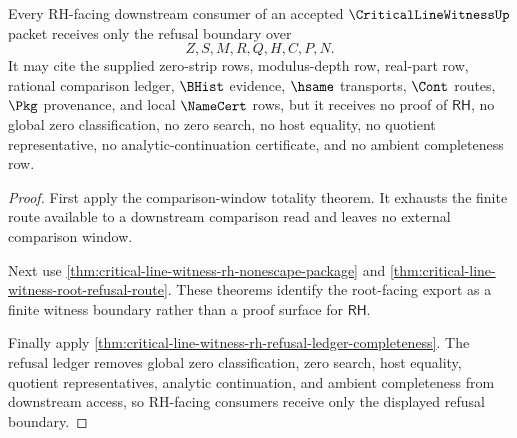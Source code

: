 \begin{theorem}
\label{thm:critical-line-witness-rh-boundary-downstream-lock}
Every RH-facing downstream consumer of an accepted $\CriticalLineWitnessUp$ packet receives only the refusal boundary over
$$
Z,S,M,R,Q,H,C,P,N.
$$
It may cite the supplied zero-strip rows, modulus-depth row, real-part row, rational comparison ledger, $\BHist$ evidence, $\hsame$ transports, $\Cont$ routes, $\Pkg$ provenance, and local $\NameCert$ rows, but it receives no proof of $\mathsf{RH}$, no global zero classification, no zero search, no host equality, no quotient representative, no analytic-continuation certificate, and no ambient completeness row.
\end{theorem}
\begin{proof}
First apply the comparison-window totality theorem. It exhausts the finite route available to a downstream comparison read and leaves no external comparison window.

Next use \autoref{thm:critical-line-witness-rh-nonescape-package} and \autoref{thm:critical-line-witness-root-refusal-route}. These theorems identify the root-facing export as a finite witness boundary rather than a proof surface for $\mathsf{RH}$.

Finally apply \autoref{thm:critical-line-witness-rh-refusal-ledger-completeness}. The refusal ledger removes global zero classification, zero search, host equality, quotient representatives, analytic continuation, and ambient completeness from downstream access, so RH-facing consumers receive only the displayed refusal boundary.
\end{proof}

